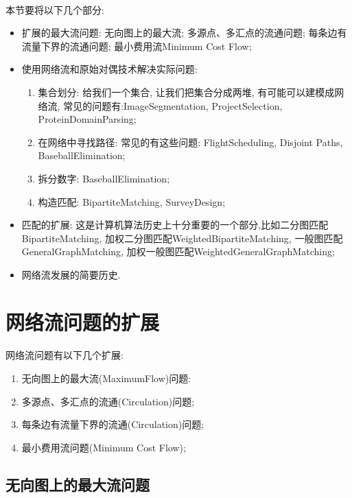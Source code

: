         \paragraph{}本节要将以下几个部分:
        \begin{itemize}
        \item 扩展的最大流问题: 无向图上的最大流; 多源点、多汇点的流通问题;  每条边有流量下界的流通问题; 最小费用流{\sc Minimum Cost Flow};
        \item 使用网络流和原始对偶技术解决实际问题:
            \begin{enumerate}
            \item 集合划分: 给我们一个集合, 让我们把集合分成两堆, 有可能可以建模成网络流, 常见的问题有:{\sc ImageSegmentation}, {\sc ProjectSelection}, {\sc ProteinDomainParsing};
            \item 在网络中寻找路径: 常见的有这些问题: {\sc FlightScheduling}, {\sc Disjoint Paths}, {\sc BaseballElimination};
            \item 拆分数字: {\sc BaseballElimination};
\item 构造匹配: {\sc BipartiteMatching}, {\sc SurveyDesign};
            \end{enumerate}
        \item 匹配的扩展: 这是计算机算法历史上十分重要的一个部分,比如二分图匹配{\sc BipartiteMatching}, 加权二分图匹配{\sc WeightedBipartiteMatching}, 一般图匹配{\sc GeneralGraphMatching}, 加权一般图匹配{\sc WeightedGeneralGraphMatching};
        \item 网络流发展的简要历史.
        \end{itemize}
    \section{网络流问题的扩展}
        \paragraph{}网络流问题有以下几个扩展:
        \begin{enumerate}
        \item 无向图上的最大流({\sc MaximumFlow})问题: 
        \item 多源点、多汇点的流通({\sc Circulation})问题;  
        \item 每条边有流量下界的流通({\sc Circulation})问题; 
        \item 最小费用流问题({\sc Minimum Cost Flow});
        \end{enumerate}
    \subsection{无向图上的最大流问题}
